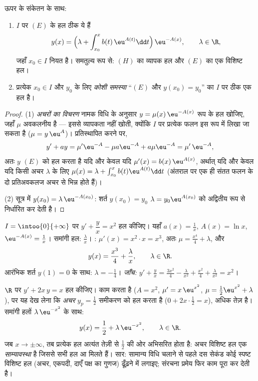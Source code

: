 \begin{theorem}\label{thm:b1:diffeq:voc}
ऊपर के संकेतन के साथ:
\begin{enumerate}
  \item $I$ पर $(E)$ के हल ठीक ये हैं
        \[
        y(x) = \Bigl(\lambda + \int_{x_0}^{x} b(t)\, \eu^{A(t)} \dd t
        \Bigr)\, \eu^{-A(x)},
        \qquad \lambda \in \R,
        \]
        जहाँ $x_0 \in I$ नियत है। समतुल्य रूप से: $(H)$ का व्यापक हल और
        $(E)$ का एक विशिष्ट हल।
  \item प्रत्येक $x_0 \in I$ और $y_0$ के लिए \emph{कोशी समस्या} ``$(E)$ और $y(x_0) = y_0$'' का $I$ पर ठीक एक हल है।
\end{enumerate}
\end{theorem}

\begin{proof}
(1) \emph{अचरों का विचरण} नामक विधि के अनुसार $y =
\mu(x)\, \eu^{-A(x)}$ रूप के हल खोजिए, जहाँ $\mu$ अवकलनीय है --- इससे
व्यापकता नहीं खोती, क्योंकि $I$ पर प्रत्येक फलन इस रूप में लिखा जा सकता है
($\mu = y\,\eu^{A}$)। प्रतिस्थापित करने पर,
\[
y' + ay = \mu' \eu^{-A} - \mu a \eu^{-A} + a\mu\eu^{-A}
= \mu'\, \eu^{-A},
\]
अतः $y$ $(E)$ को हल करता है यदि और केवल यदि $\mu'(x) = b(x)\,\eu^{A(x)}$,
अर्थात् यदि और केवल यदि किसी अचर $\lambda$ के लिए $\mu(x) = \lambda +
\int_{x_0}^x b(t)\eu^{A(t)}\dd t$ (अंतराल पर एक ही संतत फलन के दो प्रतिअवकलज
अचर से भिन्न होते हैं)।

(2) सूत्र में $y(x_0) = \lambda\,\eu^{-A(x_0)}$: शर्त $y(x_0) = y_0$
$\lambda = y_0 \eu^{A(x_0)}$ को अद्वितीय रूप से निर्धारित कर देती है।
\end{proof}

\begin{example}\label{ex:b1:diffeq:order1}
$I = \intoo{0}{+\infty}$ पर $y' + \dfrac{y}{x} = x^2$ हल कीजिए। यहाँ $a(x) =
\frac 1x$, $A(x) = \ln x$, $\eu^{-A(x)} = \frac 1x$। समांगी हल:
$\frac{\lambda}{x}$। : $\mu'(x) = x^2 \cdot x = x^3$, अतः $\mu
= \frac{x^4}{4} + \lambda$, और
\[
y(x) = \frac{x^3}{4} + \frac{\lambda}{x}, \qquad \lambda \in \R .
\]
आरंभिक शर्त $y(1) = 0$ के साथ: $\lambda = -\frac14$। \emph{जाँच:} $y' +
\frac yx = \frac{3x^2}{4} - \frac{\lambda}{x^2} + \frac{x^2}{4} +
\frac{\lambda}{x^2} = x^2$।
\end{example}

\begin{example}[अनुमान लगाना समाकलन से अच्छा है]\label{ex:b1:diffeq:guess}
$\R$ पर $y' + 2x\,y = x$ हल कीजिए।  काम करता है ($A = x^2$,
$\mu' = x\,\eu^{x^2}$, $\mu = \frac12\eu^{x^2} + \lambda$), पर यह देख लेना
कि \emph{अचर} $y_p = \frac12$ समीकरण को हल करता है ($0 + 2x\cdot\frac12 =
x$), अधिक तेज़ है। समांगी हलों $\lambda\,\eu^{-x^2}$ के साथ:
\[
y(x) = \frac12 + \lambda\,\eu^{-x^2}, \qquad \lambda \in \R .
\]
जब $x \to \pm\infty$, तब प्रत्येक हल अत्यंत तेज़ी से $\frac12$ की ओर अभिसरित
होता है: अचर विशिष्ट हल एक \emph{साम्यावस्था} है जिससे सभी हल आ मिलते हैं।
सार: सामान्य विधि चलाने से पहले दस सेकंड कोई स्पष्ट विशिष्ट हल (अचर, एकपदी,
दाएँ पक्ष का गुणज) ढूँढ़ने में लगाइए; संरचना प्रमेय फिर काम पूरा कर देती है।
\end{example}

